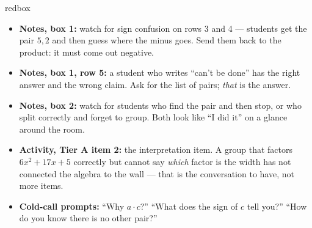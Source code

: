 \documentclass[10pt]{article}
\begin{document}
\begin{skillbox}{redbox}
\begin{itemize}[leftmargin=1.2em, itemsep=2pt, topsep=2pt]
  \item \textbf{Notes, box 1:} watch for sign confusion on rows 3 and 4 --- students get the pair
        $5, 2$ and then guess where the minus goes. Send them back to the product: it must come out
        negative.
  \item \textbf{Notes, box 1, row 5:} a student who writes ``can't be done'' has the right answer
        and the wrong claim. Ask for the list of pairs; \emph{that} is the answer.
  \item \textbf{Notes, box 2:} watch for students who find the pair and then stop, or who split
        correctly and forget to group. Both look like ``I did it'' on a glance around the room.
  \item \textbf{Activity, Tier A item 2:} the interpretation item. A group that factors
        $6x^2+17x+5$ correctly but cannot say \emph{which} factor is the width has not connected
        the algebra to the wall --- that is the conversation to have, not more items.
  \item \textbf{Cold-call prompts:} ``Why $a \cdot c$?'' ``What does the sign of $c$ tell you?''
        ``How do you know there is no other pair?''
\end{itemize}
\end{skillbox}
\end{document}
